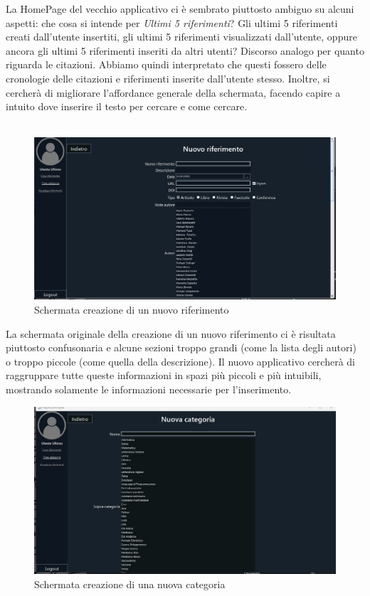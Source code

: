 La HomePage del vecchio applicativo ci è sembrato piuttosto ambiguo su alcuni aspetti: che cosa si intende per \textit{Ultimi 5 riferimenti}? Gli ultimi 5 riferimenti creati dall'utente insertiti, gli ultimi 5 riferimenti visualizzati dall'utente, oppure ancora gli ultimi 5 riferimenti inseriti da altri utenti? Discorso analogo per quanto riguarda le citazioni. Abbiamo quindi interpretato che questi fossero delle cronologie delle citazioni e riferimenti inserite dall'utente stesso. Inoltre, si cercherà di migliorare l'affordance generale della schermata, facendo capire a intuito dove inserire il testo per cercare e come cercare.
\\~\\
\begin{figure}[H]
    \centering
            \includegraphics[width=.80\textwidth]{Immagini/VecchioProgetto/crea riferimento.jpg}  

    \caption{Schermata creazione di un nuovo riferimento}
\end{figure}

La schermata originale della creazione di un nuovo riferimento ci è risultata piuttosto confusonaria e alcune sezioni troppo grandi (come la lista degli autori) o troppo piccole (come quella della descrizione). Il nuovo applicativo cercherà di raggruppare tutte queste informazioni in spazi più piccoli e più intuibili, mostrando solamente le informazioni necessarie per l'inserimento.
\begin{figure}[H]
    \centering
            \includegraphics[width=.80\textwidth]{Immagini/VecchioProgetto/crea categoria.jpg}  

    \caption{Schermata creazione di una nuova categoria}
\end{figure}

